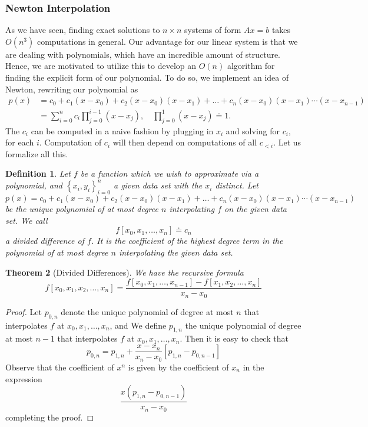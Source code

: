 \documentclass[12pt,reqno]{amsart}
\numberwithin{equation}{section}  %
\newtheorem{theorem}{Theorem}[section]
\newtheorem{definition}[theorem]{Definition}
\begin{document}
\subsubsection{Newton Interpolation}
As we have seen, finding exact solutions to $n \times n$
systems of form $Ax = b$ takes $O(n^3)$ computations in general.
Our advantage for our linear system is that we are dealing with polynomials,
which have an incredible amount of structure. Hence, we are motivated
to utilize this to develop an $O(n)$ algorithm for finding the explicit
form of our polynomial. 
To do so, we implement an idea of Newton, rewriting our polynomial as
\begin{align*}
p(x) &= c_0 + c_1(x - x_0) + c_2(x - x_0)(x - x_1) + \ldots
+ c_{n}(x - x_0)(x - x_1)\cdots(x - x_{n-1})
\\
& = \sum_{i=0}^{n} c_i \prod_{j=0}^{i-1} (x - x_j), \quad \prod_{j=0}^{1} (x - x_j) \doteq 1.
\end{align*}
The $c_i$ can be computed in a naive fashion by plugging in $x_i$ 
and solving for $c_i$, for each $i$. Computation of $c_i$ will then depend
on computations of all $c_{< i}$. Let us formalize all this. 
\begin{definition}
Let $f$ be a function which we wish to approximate via a polynomial,
and $ \left\{ x_i, y_i \right\}_{i=0}^{n} $ a given data set with the
$x_i$ distinct. Let
\begin{equation*}
p(x) = c_0 + c_1(x - x_0) + c_2(x - x_0)(x - x_1) + \ldots
+ c_{n}(x - x_0)(x - x_1)\cdots(x - x_{n-1})
\end{equation*}
be the unique polynomial of at most degree $n$ interpolating $f$
on the given data set. We call
\begin{equation*}
f[x_0, x_1, \ldots, x_n] \doteq c_n
\end{equation*}
a \emph{divided difference} of $f$. It is the coefficient of the
highest degree term in the polynomial of at most degree $n$ interpolating the
given data set. 
\end{definition}
\begin{theorem}[Divided Differences]
We have the recursive formula
\begin{equation*}
f[x_0, x_1, x_2, \ldots, x_n] = \frac{f[x_0, x_1, \ldots, x_{n-1}] - f[x_1, x_2, \ldots, x_n]}{x_n - x_0}
\end{equation*}
\end{theorem}
\begin{proof}
Let $p_{0,n}$ denote the unique polynomial of degree at most $n$ that
interpolates $f$ at $x_0, x_1, \ldots, x_n$, and  We define
$p_{1,n}$ the unique polynomial of degree at most $n-1$ that interpolates
$f$ at $x_0, x_1, \ldots, x_n$. Then it is easy to check that
\begin{equation*}
p_{0,n} = p_{1,n} + \frac{x - x_n}{x_n - x_0}[p_{1,n} - p_{0,n-1}]
\end{equation*}
Observe that the coefficient of $x^n$ is given by the coefficient of $x_n$ in the expression 
\begin{equation*}
\frac{x(p_{1,n} - p_{0,n-1})}{x_n - x_0}
\end{equation*}
completing the proof.
\end{proof}
\end{document}
